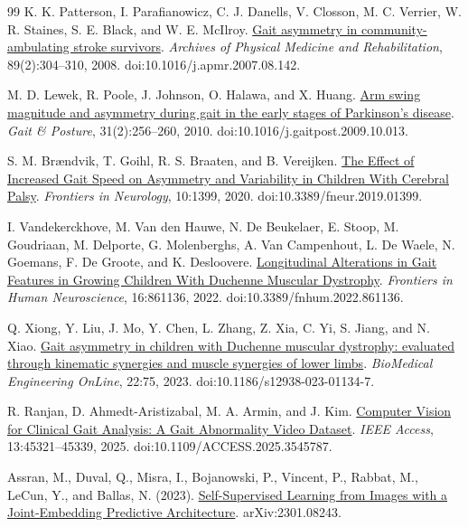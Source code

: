 \documentclass{article}
\begin{document}
{\renewcommand{\bibfont}{\small}
\begin{thebibliography}{99}
 K. K. Patterson, I. Parafianowicz, C. J. Danells, V. Closson, M. C. Verrier, W. R. Staines, S. E. Black, and W. E. McIlroy. \href{https://pubmed.ncbi.nlm.nih.gov/18226655/}{Gait asymmetry in community-ambulating stroke survivors}. \emph{Archives of Physical Medicine and Rehabilitation}, 89(2):304--310, 2008. doi:10.1016/j.apmr.2007.08.142.

 M. D. Lewek, R. Poole, J. Johnson, O. Halawa, and X. Huang. \href{https://pubmed.ncbi.nlm.nih.gov/19945285/}{Arm swing magnitude and asymmetry during gait in the early stages of Parkinson's disease}. \emph{Gait \& Posture}, 31(2):256--260, 2010. doi:10.1016/j.gaitpost.2009.10.013.

 S. M. Brændvik, T. Goihl, R. S. Braaten, and B. Vereijken. \href{https://pubmed.ncbi.nlm.nih.gov/32082235/}{The Effect of Increased Gait Speed on Asymmetry and Variability in Children With Cerebral Palsy}. \emph{Frontiers in Neurology}, 10:1399, 2020. doi:10.3389/fneur.2019.01399.

 I. Vandekerckhove, M. Van den Hauwe, N. De Beukelaer, E. Stoop, M. Goudriaan, M. Delporte, G. Molenberghs, A. Van Campenhout, L. De Waele, N. Goemans, F. De Groote, and K. Desloovere. \href{https://pmc.ncbi.nlm.nih.gov/articles/PMC9201072/}{Longitudinal Alterations in Gait Features in Growing Children With Duchenne Muscular Dystrophy}. \emph{Frontiers in Human Neuroscience}, 16:861136, 2022. doi:10.3389/fnhum.2022.861136.

 Q. Xiong, Y. Liu, J. Mo, Y. Chen, L. Zhang, Z. Xia, C. Yi, S. Jiang, and N. Xiao. \href{https://pmc.ncbi.nlm.nih.gov/articles/PMC10388506/}{Gait asymmetry in children with Duchenne muscular dystrophy: evaluated through kinematic synergies and muscle synergies of lower limbs}. \emph{BioMedical Engineering OnLine}, 22:75, 2023. doi:10.1186/s12938-023-01134-7.

 R. Ranjan, D. Ahmedt-Aristizabal, M. A. Armin, and J. Kim. \href{https://arxiv.org/abs/2407.04190}{Computer Vision for Clinical Gait Analysis: A Gait Abnormality Video Dataset}. \emph{IEEE Access}, 13:45321--45339, 2025. doi:10.1109/ACCESS.2025.3545787.

 Assran, M., Duval, Q., Misra, I., Bojanowski, P., Vincent, P., Rabbat, M., LeCun, Y., and Ballas, N. (2023). \href{https://arxiv.org/abs/2301.08243}{Self-Supervised Learning from Images with a Joint-Embedding Predictive Architecture}. arXiv:2301.08243.


\end{thebibliography}}
\end{document}
